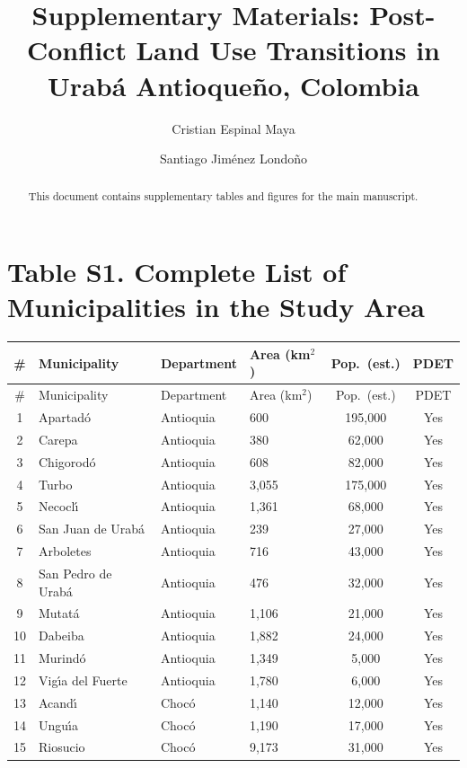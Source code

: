 \documentclass[linenumbers,twocolumn]{aastex631}
\begin{document}
\title{Supplementary Materials: Post-Conflict Land Use Transitions in Urab\'a Antioque\~no, Colombia}

\author{Cristian Espinal Maya}

\author{Santiago Jim\'{e}nez Londo\~{n}o}

\begin{abstract}
This document contains supplementary tables and figures for the main manuscript.
\end{abstract}



\section{Table S1. Complete List of Municipalities in the Study Area}

\begin{longtable}{clllcc}
\toprule
\# & Municipality & Department & Area (km$^2$) & Pop.\ (est.) & PDET \\
\midrule
\endfirsthead
\toprule
\# & Municipality & Department & Area (km$^2$) & Pop.\ (est.) & PDET \\
\midrule
\endhead
1  & Apartad\'o             & Antioquia & 600   & 195,000 & Yes \\
2  & Carepa                 & Antioquia & 380   &  62,000 & Yes \\
3  & Chigorod\'o            & Antioquia & 608   &  82,000 & Yes \\
4  & Turbo                  & Antioquia & 3,055 & 175,000 & Yes \\
5  & Necocl\'{\i}           & Antioquia & 1,361 &  68,000 & Yes \\
6  & San Juan de Urab\'a    & Antioquia & 239   &  27,000 & Yes \\
7  & Arboletes              & Antioquia & 716   &  43,000 & Yes \\
8  & San Pedro de Urab\'a   & Antioquia & 476   &  32,000 & Yes \\
9  & Mutat\'a               & Antioquia & 1,106 &  21,000 & Yes \\
10 & Dabeiba                & Antioquia & 1,882 &  24,000 & Yes \\
11 & Murind\'o              & Antioquia & 1,349 &   5,000 & Yes \\
12 & Vig\'{\i}a del Fuerte  & Antioquia & 1,780 &   6,000 & Yes \\
13 & Acand\'{\i}            & Choc\'o   & 1,140 &  12,000 & Yes \\
14 & Ungu\'{\i}a            & Choc\'o   & 1,190 &  17,000 & Yes \\
15 & Riosucio               & Choc\'o   & 9,173 &  31,000 & Yes \\
\bottomrule
\end{longtable}
\end{document}
